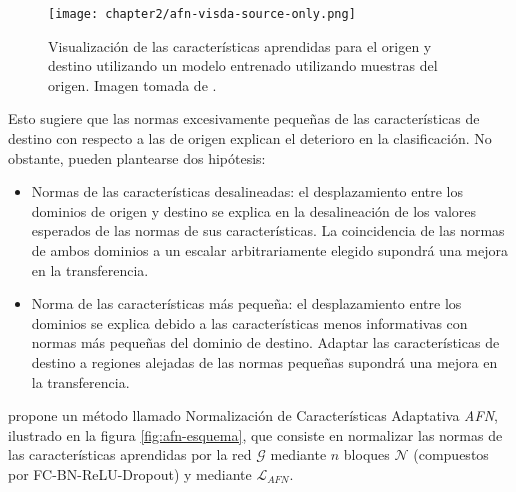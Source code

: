 \begin{figure}[H]
    \centering
    \texttt{[image: chapter2/afn-visda-source-only.png]}

    \caption[Representación de características aprendidas de una CNN]{Visualización de las características aprendidas para el origen y destino utilizando un modelo entrenado utilizando muestras del origen. Imagen tomada de \cite{xu2019larger}.}
    \label{fig:afn-source-only}
\end{figure}

Esto sugiere que las normas excesivamente pequeñas de las características de destino con respecto a las de origen
explican el deterioro en la clasificación. No obstante, pueden plantearse dos hipótesis:

\begin{itemize}
    \item Normas de las características desalineadas: el desplazamiento entre los dominios de origen y destino se explica en la
          desalineación de los valores esperados de las normas de sus características. La coincidencia de las normas de ambos
          dominios a un escalar arbitrariamente elegido supondrá una mejora en la transferencia.
    \item Norma de las características más pequeña: el desplazamiento entre los dominios se explica debido a las características
          menos informativas con normas más pequeñas del dominio de destino. Adaptar las características de destino a regiones
          alejadas de las normas pequeñas supondrá una mejora en la transferencia.
\end{itemize}

\cite{xu2019larger} propone un método llamado Normalización de Características Adaptativa {\it AFN}, ilustrado en la figura \ref{fig:afn-esquema}, que consiste en normalizar las normas de las características aprendidas por la red $\mathcal{G}$ mediante $n$ bloques $\mathcal{N}$ (compuestos por FC-BN-ReLU-Dropout) y mediante $\mathcal{L}_{AFN}$.

